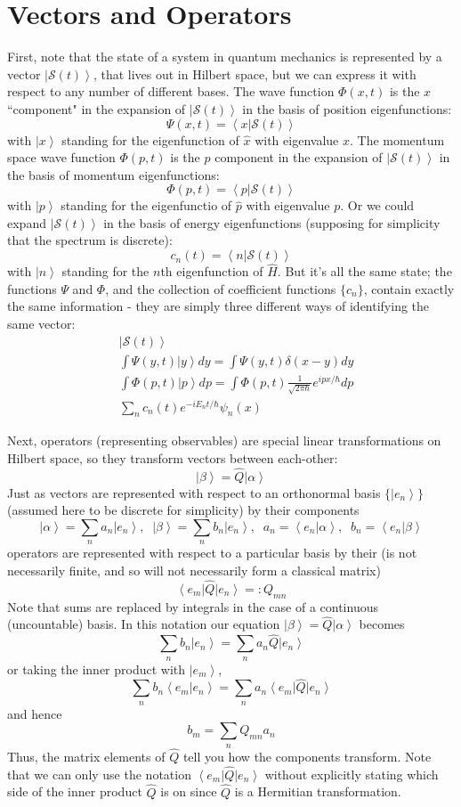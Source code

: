 \documentclass[12pt, a4paper, oneside, openright, titlepage]{book}
\newcommand{\bra}[1]{\left\langle#1\right\vert}
\newcommand{\ket}[1]{\left\vert#1\right\rangle}
\newcommand{\braket}[2]{\left\langle#1\right\vert\left.#2\right\rangle}
\begin{document}
\section{Vectors and Operators}

First, note that the state of a system in quantum mechanics is represented by a vector $\ket{\mathcal{S}(t)}$, that lives out in Hilbert space, but we can express it with respect to any number of different bases. The wave function $\Phi(x,t)$ is the $x$ ``component" in the expansion of $\ket{\mathcal{S}(t)}$ in the basis of position eigenfunctions: $$\Psi(x,t) = \braket{x}{\mathcal{S}(t)}$$ with $\ket{x}$ standing for the eigenfunction of $\hat{x}$ with eigenvalue $x$. The momentum space wave function $\Phi(p,t)$ is the $p$ component in the expansion of $\ket{\mathcal{S}(t)}$ in the basis of momentum eigenfunctions: $$\Phi(p,t) = \braket{p}{\mathcal{S}(t)}$$
with $\ket{p}$ standing for the eigenfunctio of $\hat{p}$ with eigenvalue $p$. Or we could expand $\ket{\mathcal{S}(t)}$ in the basis of energy eigenfunctions (supposing for simplicity that the spectrum is discrete): $$c_n(t) = \braket{n}{\mathcal{S}(t)}$$
with $\ket{n}$ standing for the $n$th eigenfunction of $\hat{H}$. But it's all the same state; the functions $\Psi$ and $\Phi$, and the collection of coefficient functions $\{c_n\}$, contain exactly the same information - they are simply three different ways of identifying the same vector: \begin{align*}
    &\ket{\mathcal{S}(t)} \\
    & \int\Psi(y,t)\ket{y}dy = \int\Psi(y,t)\delta(x-y)dy \\
    & \int\Phi(p,t)\ket{p}dp = \int\Phi(p,t)\frac{1}{\sqrt{2\pi\hbar}}e^{ipx/\hbar}dp \\
    & \sum_nc_n(t)e^{-iE_nt/\hbar}\psi_n(x)
\end{align*}

Next, operators (representing observables) are special linear transformations on Hilbert space, so they transform vectors between each-other: $$\ket{\beta} = \hat{Q}\ket{\alpha}$$
Just as vectors are represented with respect to an orthonormal basis $\{\ket{e_n}\}$ (assumed here to be discrete for simplicity) by their components $$\ket{\alpha} = \sum_na_n\ket{e_n},\;\;\ket{\beta} = \sum_nb_n\ket{e_n},\;\;a_n = \braket{e_n}{\alpha},\;\;b_n = \braket{e_n}{\beta}$$
operators are represented with respect to a particular basis by their  (is not necessarily finite, and so will not necessarily form a classical matrix) $$\bra{e_m}\hat{Q}\ket{e_n} =: Q_{mn}$$
Note that sums are replaced by integrals in the case of a continuous (uncountable) basis. In this notation our equation $\ket{\beta} = \hat{Q}\ket{\alpha}$ becomes $$\sum_nb_n\ket{e_n} = \sum_na_n\hat{Q}\ket{e_n}$$
or taking the inner product with $\ket{e_m}$, $$\sum_nb_n\braket{e_m}{e_n} = \sum_na_n\bra{e_m}\hat{Q}\ket{e_n}$$ and hence $$b_m = \sum_nQ_{mn}a_n$$ Thus, the matrix elements of $\hat{Q}$ tell you how the components transform. Note that we can only use the notation $\bra{e_m}\hat{Q}\ket{e_n}$ without explicitly stating which side of the inner product $\hat{Q}$ is on since $\hat{Q}$ is a Hermitian transformation.
\end{document}

